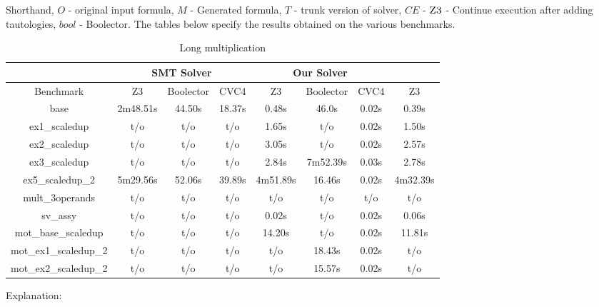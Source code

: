 Shorthand, $O$ - original input formula, $M$ - Generated formula, $T$ - trunk version of solver, $CE$ - $\textsc{Z3}$ - Continue execution after adding tautologies, $bool$ - Boolector.
The tables below specify the results obtained on the various benchmarks.
%

\begin{table}[]
\centering
\caption{Long multiplication}
\label{my-label}
\begin{tabular}{|c|c|c|c|c|c|c|c|}
\hline
                      & \multicolumn{3}{c|}{SMT Solver} & \multicolumn{3}{c|}{Our Solver} &          \\ \hline
Benchmark             & Z3        & Boolector  & CVC4   & Z3        & Boolector  & CVC4   & Z3       \\ \hline
base                  & 2m48.51s  & 44.50s     & 18.37s & 0.48s     & 46.0s      & 0.02s  & 0.39s    \\ \hline
ex1\_scaledup         & t/o       & t/o        & t/o    & 1.65s     & t/o        & 0.02s  & 1.50s    \\ \hline
ex2\_scaledup         & t/o       & t/o        & t/o    & 3.05s     & t/o        & 0.02s  & 2.57s    \\ \hline
ex3\_scaledup         & t/o       & t/o        & t/o    & 2.84s     & 7m52.39s   & 0.03s  & 2.78s    \\ \hline
ex5\_scaledup\_2      & 5m29.56s  & 52.06s     & 39.89s & 4m51.89s  & 16.46s     & 0.02s  & 4m32.39s \\ \hline
mult\_3operands       & t/o       & t/o        & t/o    & t/o       & t/o        & t/o    & t/o      \\ \hline
sv\_assy              & t/o       & t/o        & t/o    & 0.02s     & t/o        & 0.02s  & 0.06s    \\ \hline
mot\_base\_scaledup   & t/o       & t/o        & t/o    & 14.20s    & t/o        & 0.02s  & 11.81s   \\ \hline
mot\_ex1\_scaledup\_2 & t/o       & t/o        & t/o    & t/o       & 18.43s     & 0.02s  & t/o      \\ \hline
mot\_ex2\_scaledup\_2 & t/o       & t/o        & t/o    & t/o       & 15.57s     & 0.02s  & t/o      \\ \hline
\end{tabular}
\end{table}




Explanation: 

